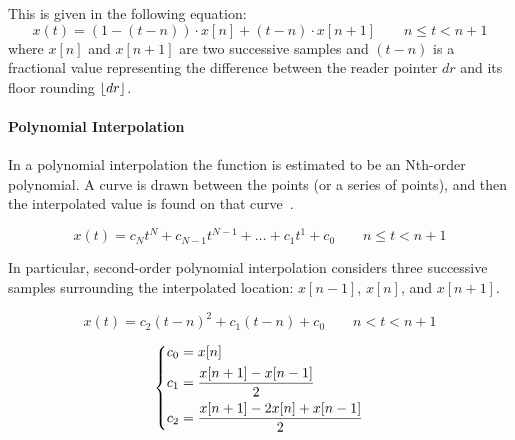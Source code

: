 This is given in the following equation:
\[
	x(t) = (1 - (t - n)) \cdot x[n] + (t-n) \cdot x[n+1] \qquad n \leq t < n + 1
\]
where $x[n]$ and $x[n+1]$ are two successive samples and $(t-n)$ is a fractional value representing the difference between the reader pointer $dr$ and its floor rounding $\lfloor dr\rfloor$.

\paragraph{Polynomial Interpolation}
In a polynomial interpolation the function is estimated to be an Nth-order polynomial. A curve is drawn between the points (or a series of points), and then the interpolated value is found on that curve~\cite{pirkle2013designing}.

\[
	x(t) = c_{N}t^{N} + c_{N-1}t^{N-1} + \dots + c_{1}t^{1} + c_{0} \qquad n \leq t< n + 1
\]

In particular, second-order polynomial interpolation considers three successive samples surrounding the interpolated location: $x[n-1]$, $x[n]$, and $x[n+1]$. 

\[
	x(t) = c_{2}(t-n)^{2} + c_{1}(t-n) + c_{0} \qquad n < t < n + 1
\]

\[
	\begin{dcases}
		c_{0} = x[n] \\
		c_{1} = \frac{x[n+1] - x[n-1]}{2} \\
		c_{2} = \frac{x[n+1] - 2 x[n] + x[n-1]}{2} 
	\end{dcases}
\]


